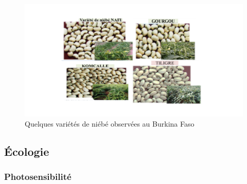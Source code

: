 \documentclass[a4paper,11pt]{article}
\begin{document}
\begin{figure}%
  \begin{center}
    \includegraphics[width=12cm]{images/graines_niebe}
  \end{center}
  \caption{Quelques variétés de niébé observées au Burkina Faso}
\end{figure}

\subsection{Écologie}

\subsubsection{Photosensibilité}
\end{document}
